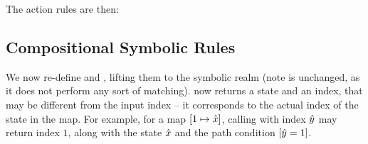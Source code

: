The action rules are then:

\subsection{Compositional Symbolic Rules}

We now re-define  and , lifting them to the symbolic realm (note  is unchanged, as it does not perform any sort of matching).  now returns a state and an index, that may be different from the input index -- it corresponds to the actual index of the state in the map. For example, for a map $[ 1 \mapsto \hat{x}]$, calling  with index $\hat{y}$ may return index $1$, along with the state $\hat{x}$ and the path condition $[\hat{y} = 1]$.

